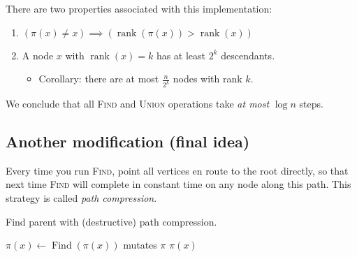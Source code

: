 There are two properties associated with this implementation:
\begin{enumerate}
	\item \(\left(\pi(x) \neq x\right) \implies \left(\operatorname{rank}(\pi(x)) > \operatorname{rank}(x)\right)\)
	\item A node \(x\) with \(\operatorname{rank}(x) = k\) has at least \(2^k\) descendants.
	\begin{itemize}
		\item Corollary: there are at most \(\frac{n}{2^k}\) nodes with rank \(k\).
	\end{itemize}
\end{enumerate}
We conclude that all \textsc{Find} and \textsc{Union} operations take \emph{at most} \(\log n\) steps.

\subsection{Another modification (final idea)}
Every time you run \textsc{Find}, point all vertices en route to the root directly, so that next time \textsc{Find} will complete in constant time on any node along this path. This strategy is called \emph{path compression}.

\begin{algorithm}
	\caption{Find parent with (destructive) path compression.}
	\begin{algorithmic}
		\State {}
		\Else
		\State \(\pi(x)\leftarrow \operatorname{Find}(\pi(x))\) 
		\Comment mutates \(\pi\)
		\State \Return \(\pi(x)\)
		\EndIf
		\EndProcedure
	\end{algorithmic}
\end{algorithm}

